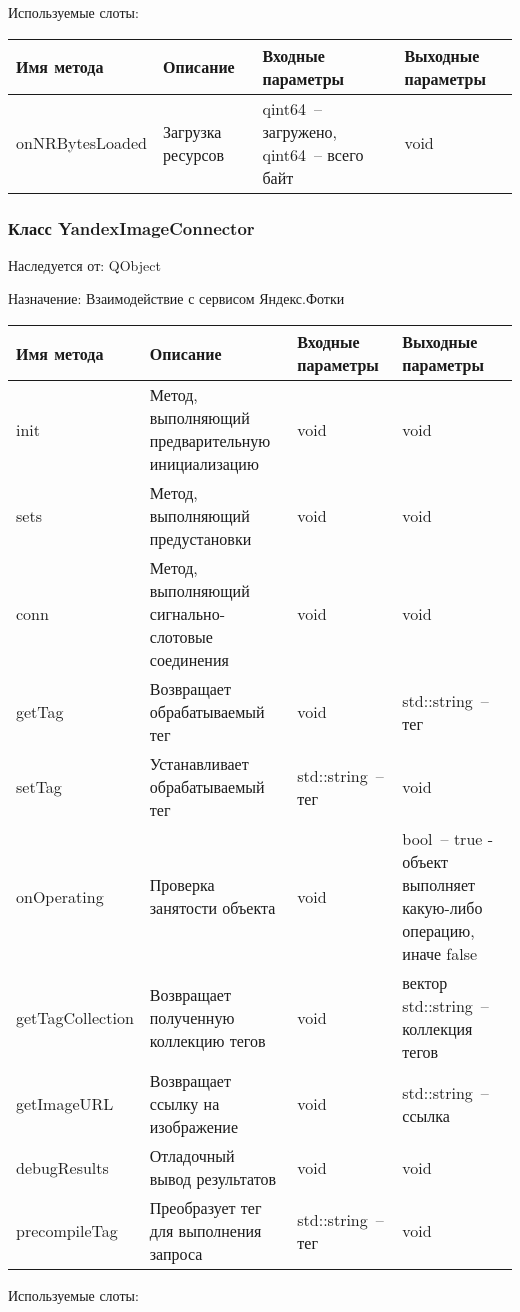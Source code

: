 \documentclass[a4paper,14pt,russian]{extreport}
\begin{document}
Используемые слоты:

\begin{longtable}{|m{3 cm}|m{3 cm}|m{4 cm}|m{4 cm}|}
\hline
Имя метода & Описание & Входные параметры & Выходные параметры \\
\hline
{on\-NR\-Bytes\-Loaded} & Загрузка ресурсов & qint64~-- загружено, qint64~-- всего байт & void\\
\hline
\end{longtable}

\newpage

\subsubsection{Класс YandexImageConnector}

Наследуется от: QObject

Назначение: Взаимодействие с сервисом Яндекс.Фотки

\begin{longtable}{|m{3 cm}|m{3 cm}|m{4 cm}|m{4 cm}|}
\hline
Имя метода & Описание & Входные параметры & Выходные параметры \\
\hline
init & Метод, выполняющий предварительную инициализацию & void & void \\
\hline
sets & Метод, выполняющий предустановки & void & void \\
\hline
conn & Метод, выполняющий сигнально-слотовые соединения & void & void \\
\hline
getTag & Возвращает обрабатываемый тег & void & std::string~-- тег \\
\hline
setTag & Устанавливает обрабатываемый тег & std::string~-- тег & void \\
\hline
{on\-Operating} & Проверка занятости объекта & void& bool~-- true - объект выполняет какую-либо операцию, иначе false \\
\hline
{get\-Tag\-Collection} & Возвращает полученную коллекцию тегов & void & вектор std::string~-- коллекция тегов \\
\hline
{get\-Image\-URL} & Возвращает ссылку на изображение & void & std::string~-- ссылка \\
\hline
{debug\-Results} & Отладочный вывод результатов & void & void \\
\hline
{precompile\-Tag} & Преобразует тег для выполнения запроса & std::string~-- тег & void \\
\hline
\end{longtable}

Используемые слоты:
\end{document}
